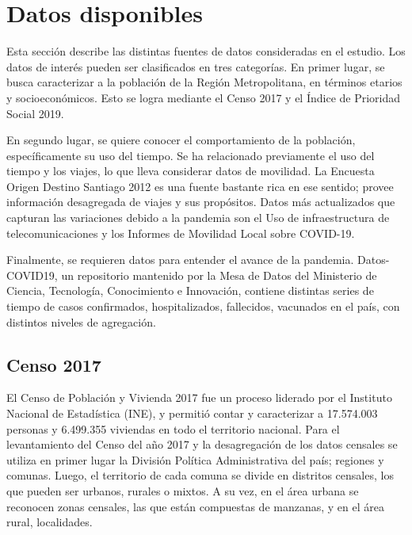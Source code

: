 \section{Datos disponibles}

Esta sección describe las distintas fuentes de datos consideradas en el estudio. Los datos de interés pueden ser clasificados en tres categorías. En primer lugar, se busca caracterizar a la población de la Región Metropolitana, en términos etarios y socioeconómicos. Esto se logra mediante el Censo 2017 y el Índice de Prioridad Social 2019.

En segundo lugar, se quiere conocer el comportamiento de la población, específicamente su uso del tiempo. Se ha relacionado previamente \cite{Munizaga2011}\cite{Kitamura1988}\cite{Axhausen1992} el uso del tiempo y los viajes, lo que lleva considerar datos de movilidad. La Encuesta Origen Destino Santiago 2012 es una fuente bastante rica en ese sentido; provee información desagregada de viajes y sus propósitos. Datos más actualizados que capturan las variaciones debido a la pandemia son el Uso de infraestructura de telecomunicaciones y los Informes de Movilidad Local sobre COVID-19.

Finalmente, se requieren datos para entender el avance de la pandemia. Datos-COVID19, un repositorio mantenido por la Mesa de Datos del Ministerio de Ciencia, Tecnología, Conocimiento e Innovación, contiene distintas series de tiempo de casos confirmados, hospitalizados, fallecidos, vacunados en el país, con distintos niveles de agregación.


\subsection{Censo 2017}

El Censo de Población y Vivienda 2017 fue un proceso liderado por el Instituto Nacional de Estadística (INE), y permitió contar y caracterizar a 17.574.003 personas y 6.499.355 viviendas en todo el territorio nacional.
Para el levantamiento del Censo del año 2017 y la desagregación de los datos censales se utiliza  en primer lugar la División Política Administrativa del país; regiones y comunas. Luego, el territorio de cada comuna se divide en distritos censales, los que pueden ser urbanos, rurales o mixtos. A su vez, en el área urbana se reconocen zonas censales, las que están compuestas de manzanas, y en el área rural, localidades.

